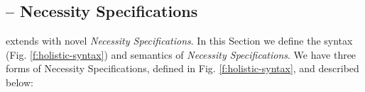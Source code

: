 




\subsection{\Chainmail -- Necessity Specifications}
\label{s:holistic-guarantees}

\Chainmail extends \SpecO with novel 
\emph{Necessity Specifications}.
In this Section we define the syntax (Fig. \ref{f:holistic-syntax}) and semantics of
\emph{Necessity Specifications}.
We have three forms of Necessity Specifications, defined in Fig. \ref{f:holistic-syntax}, and described below:


